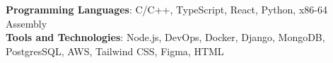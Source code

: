 \begin{itemize}[leftmargin=0in, label={}]
    \small{\item{
     \textbf{Programming Languages}{: C/C++, TypeScript, React, Python,  x86-64 Assembly} \\
     \textbf{Tools and Technologies}{: Node.js, DevOps, Docker, Django, MongoDB,
     PostgresSQL, AWS, Tailwind
     CSS, Figma, HTML} \\
    }}
\end{itemize}